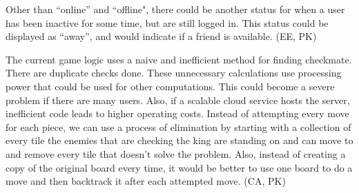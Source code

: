 \documentclass[acmlarge, review=false, screen=true]{acmart}
\begin{document}
  Other than “online” and “offline", there could be another status for when a user has been inactive for some time, but are still logged in. This status could be displayed as “away”, and would indicate if a friend is available. (EE, PK)

  The current game logic uses a naive and inefficient method for finding checkmate. There are duplicate checks done. These unnecessary calculations use processing power that could be used for other computations. This could become a severe problem if there are many users. Also, if a scalable cloud service hosts the server, inefficient code leads to higher operating costs. Instead of attempting every move for each piece, we can use a process of elimination by starting with a collection of every tile the enemies that are checking the king are standing on and can move to and remove every tile that doesn't solve the problem. Also, instead of creating a copy of the original board every time, it would be better to use one board to do a move and then backtrack it after each attempted move. (CA, PK)

  
\end{document}
